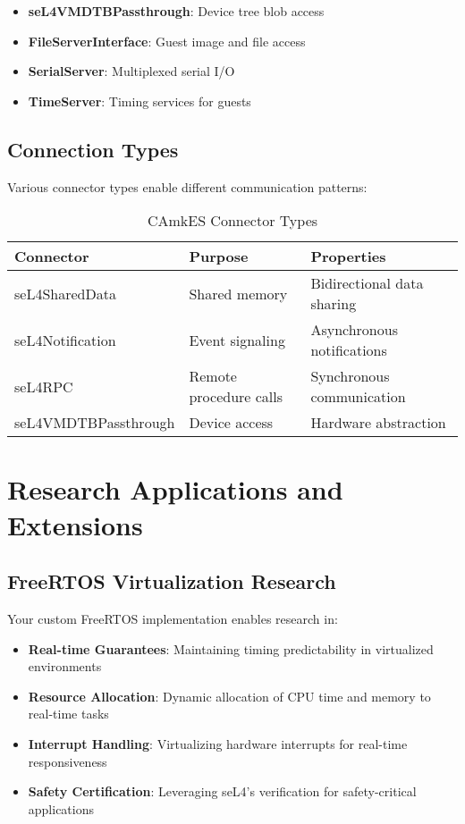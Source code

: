\documentclass[12pt,a4paper]{article}
\begin{document}
\begin{itemize}
    \item \textbf{seL4VMDTBPassthrough}: Device tree blob access
    \item \textbf{FileServerInterface}: Guest image and file access
    \item \textbf{SerialServer}: Multiplexed serial I/O
    \item \textbf{TimeServer}: Timing services for guests
\end{itemize}

\subsection{Connection Types}

Various connector types enable different communication patterns:

\begin{table}[h!]
\centering
\begin{tabular}{@{}lll@{}}
\toprule
\textbf{Connector} & \textbf{Purpose} & \textbf{Properties} \\
\midrule
seL4SharedData & Shared memory & Bidirectional data sharing \\
seL4Notification & Event signaling & Asynchronous notifications \\
seL4RPC & Remote procedure calls & Synchronous communication \\
seL4VMDTBPassthrough & Device access & Hardware abstraction \\
\bottomrule
\end{tabular}
\caption{CAmkES Connector Types}
\end{table}

\section{Research Applications and Extensions}

\subsection{FreeRTOS Virtualization Research}

Your custom FreeRTOS implementation enables research in:

\begin{itemize}
    \item \textbf{Real-time Guarantees}: Maintaining timing predictability in virtualized environments
    \item \textbf{Resource Allocation}: Dynamic allocation of CPU time and memory to real-time tasks
    \item \textbf{Interrupt Handling}: Virtualizing hardware interrupts for real-time responsiveness
    \item \textbf{Safety Certification}: Leveraging seL4's verification for safety-critical applications
\end{itemize}
\end{document}
